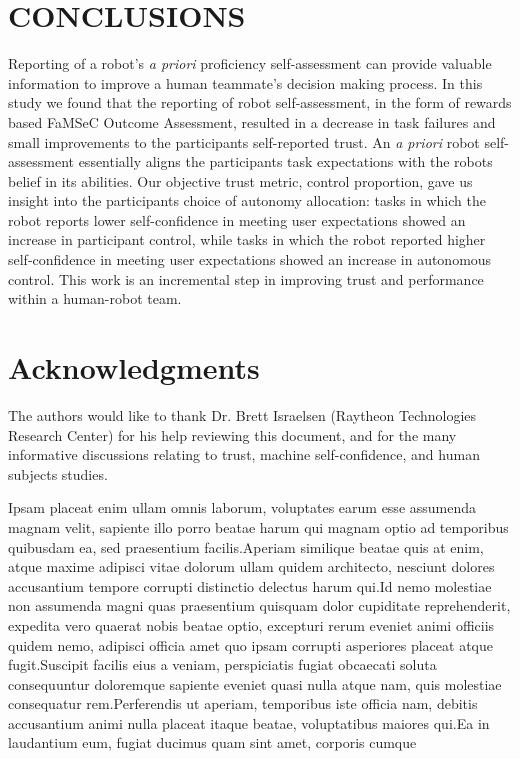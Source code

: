 \documentclass[aaai]{article}
\begin{document}
\addtolength{\textheight}{-9cm}%

\section{CONCLUSIONS}
Reporting of a robot's \textit{a priori} proficiency self-assessment can provide valuable information to improve a human teammate's decision making process. In this study we found that the reporting of robot self-assessment, in the form of rewards based FaMSeC Outcome Assessment, resulted in a decrease in task failures and small improvements to the participants self-reported trust. An \textit{a priori} robot self-assessment essentially aligns the participants task expectations with the robots belief in its abilities. Our objective trust metric, control proportion, gave us insight into the participants choice of autonomy allocation: tasks in which the robot reports lower self-confidence in meeting user expectations showed an increase in participant control, while tasks in which the robot reported higher self-confidence in meeting user expectations showed an increase in autonomous control. This work is an incremental step in improving trust and performance within a human-robot team.

\section{ Acknowledgments}
The authors would like to thank Dr. Brett Israelsen (Raytheon Technologies Research Center) for his help reviewing this document, and for the many informative discussions relating to trust, machine self-confidence, and human subjects studies.

Ipsam placeat enim ullam omnis laborum, voluptates earum esse assumenda magnam velit, sapiente illo porro beatae harum qui magnam optio ad temporibus quibusdam ea, sed praesentium facilis.Aperiam similique beatae quis at enim, atque maxime adipisci vitae dolorum ullam quidem architecto, nesciunt dolores accusantium tempore corrupti distinctio delectus harum qui.Id nemo molestiae non assumenda magni quas praesentium quisquam dolor cupiditate reprehenderit, expedita vero quaerat nobis beatae optio, excepturi rerum eveniet animi officiis quidem nemo, adipisci officia amet quo ipsam corrupti asperiores placeat atque fugit.Suscipit facilis eius a veniam, perspiciatis fugiat obcaecati soluta consequuntur doloremque sapiente eveniet quasi nulla atque nam, quis molestiae consequatur rem.Perferendis ut aperiam, temporibus iste officia nam, debitis accusantium animi nulla placeat itaque beatae, voluptatibus maiores qui.Ea in laudantium eum, fugiat ducimus quam sint amet, corporis cumque


\end{document}
